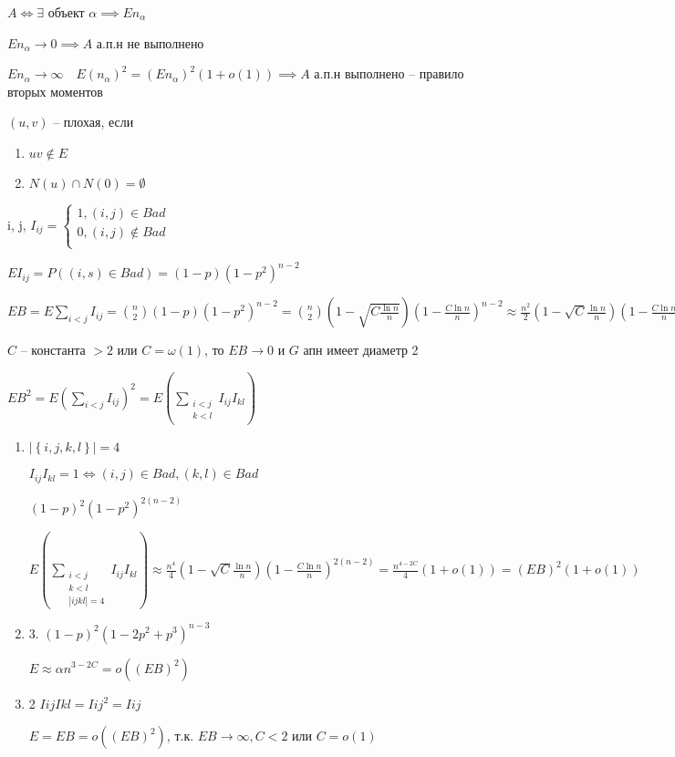 \documentclass{book}
\renewcommand\O{\ensuremath{\emptyset}}
\theoremstyle{definition}
\begin{document}
$A \iff \exists $ объект $\alpha \implies E n_{\alpha}$

$E n_{\alpha} \to 0 \implies A$ а.п.н не выполнено

$E n_{\alpha} \to \infty \quad E\left( n_{\alpha} \right) ^2 = \left( En_{\alpha} \right) ^2\left( 1 + o(1) \right) \implies A $ а.п.н выполнено -- правило вторых моментов

$(u,v)$ -- плохая, если
 \begin{enumerate}
    \item $uv \not\in E$
    \item $N(u) \cap N(0) = \O $
\end{enumerate}

i, j, $I_{ij} = \begin{cases}
    1, (i,j)\in Bad\\
    0, (i,j)\not\in Bad\\
\end{cases}$ 

$E I_{ij} = P\left( (i,s)\in Bad \right) = (1-p)(1-p^2)^{n-2}$

$E B = E \sum_{i<j}I_{ij} = {n\choose 2}(1-p)(1-p^2)^{n-2} = {n\choose 2}\left( 1- \sqrt{C \frac{\ln  n}{n}}  \right) \left( 1 - \frac{C\ln  n}{n} \right)^{n-2}\approx \frac{n^2}{2}\left( 1 - \sqrt{C}\frac{\ln n}{n}  \right) \left( 1 - \frac{C\ln n}{n} \right) ^n \approx \frac{n^2}{2}e^{-c\ln n} = \frac{n^2\cdot n^{-c}}{2} = \frac{1}{2}n^{2-c} $ 

$C$ -- константа $>2$ или  $C = \omega(1)$, то  $EB \to 0$ и $G$ апн имеет диаметр 2

$EB^2 = E\left( \sum_{i<j}I_{ij} \right) ^2 = E\left( \sum_{\substack{i<j\\k<l\\}}I_{ij}I_{kl} \right) $ 
\begin{enumerate}
    \item $\left| \left\{ i, j, k, l \right\} \right| =4$

        $I_{ij}I_{kl} = 1  \iff (i,j)\in Bad,(k,l)\in Bad$

        $(1-p)^2(1-p^2)^{2(n-2)}$

        $E\left( \sum_{\substack{i<j\\k<l\\|ijkl|=4}}I_{ij}I_{kl} \right) \approx \frac{n^{4}}{4}\left( 1 - \sqrt{C} \frac{\ln n}{n}  \right) \left( 1 - \frac{C\ln n}{n} \right) ^{2(n-2)} = \frac{n^{4 - 2C}}{4}\left( 1 + o(1) \right) = \left( EB \right) ^2\left( 1 + o(1) \right) $

    \item 3. $(1-p)^2(1-2p^2+p^3)^{n-3}$

        $E \approx \alpha n^{3-2C} = o\left( \left( EB \right) ^2 \right) $
    \item 2 $I{ij}I{kl} = I{ij}^2 = I{ij}$

        $E = EB = o\left( \left( EB \right) ^2 \right) $, т.к. $EB \to \infty , C <2$ или $C = o(1)$
\end{enumerate}
\end{document}
